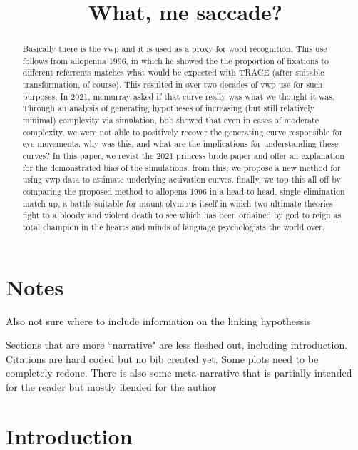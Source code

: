 \documentclass{article}
\title{What, me saccade?}
\date{}
\begin{document}

\maketitle

%

\begin{abstract}
Basically there is the vwp and it is used as a proxy for word recognition. This use follows from allopenna 1996, in which he showed the the proportion of fixations to different referrents matches what would be expected with TRACE (after suitable transformation, of course). This resulted in over two decades of vwp use for such purposes. In 2021, mcmurray asked if that curve really was what we thought it was. Through an analysis of generating hypotheses of increasing (but still relatively minimal) complexity via simulation, bob showed that even in cases of moderate complexity, we were not able to positively recover the generating curve responsible for eye movements. why was this, and what are the implications for understanding these curves? In this paper, we revist the 2021 princess bride paper and offer an explanation for the demonstrated bias of the simulations. from this, we propose a new method for using vwp data to estimate underlying activation curves. finally, we top this all off by comparing the proposed method to allopena 1996 in a head-to-head, single elimination match up, a battle suitable for mount olympus itself in which two ultimate theories fight to a bloody and violent death to see which has been ordained by god to reign as total champion in the hearts and minds of language psychologists the world over.
\end{abstract}

\section*{Notes}

Also not sure where to include information on the linking hypothessis

Sections that are more ``narrative" are less fleshed out, including introduction. Citations are hard coded but no bib created yet. Some plots need to be completely redone. There is also some meta-narrative that is partially intended for the reader but mostly itended for the author

\section{Introduction}
\end{document}
